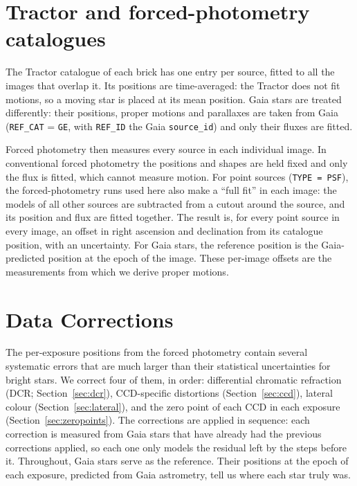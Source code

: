 \documentclass[usenatbib]{mnras}   %
\begin{document}
\section{Tractor and forced-photometry catalogues} \label{sec:forced}

The Tractor catalogue of each brick has one entry per source, fitted to all the images that overlap it. Its positions are time-averaged: the Tractor does not fit motions, so a moving star is placed at its mean position. Gaia stars are treated differently: their positions, proper motions and parallaxes are taken from Gaia (\texttt{REF\_CAT} = \texttt{GE}, with \texttt{REF\_ID} the Gaia \texttt{source\_id}) and only their fluxes are fitted.

Forced photometry then measures every source in each individual image. In conventional forced photometry the positions and shapes are held fixed and only the flux is fitted, which cannot measure motion. For point sources (\texttt{TYPE = PSF}), the forced-photometry runs used here also make a ``full fit'' in each image: the models of all other sources are subtracted from a cutout around the source, and its position and flux are fitted together. The result is, for every point source in every image, an offset in right ascension and declination from its catalogue position, with an uncertainty. For Gaia stars, the reference position is the Gaia-predicted position at the epoch of the image. These per-image offsets are the measurements from which we derive proper motions.

\section{Data Corrections} \label{sec:corrections}

The per-exposure positions from the forced photometry contain several systematic errors that are much larger than their statistical uncertainties for bright stars. We correct four of them, in order: differential chromatic refraction (DCR; Section~\ref{sec:dcr}), CCD-specific distortions (Section~\ref{sec:ccd}), lateral colour (Section~\ref{sec:lateral}), and the zero point of each CCD in each exposure (Section~\ref{sec:zeropoints}). The corrections are applied in sequence: each correction is measured from Gaia stars that have already had the previous corrections applied, so each one only models the residual left by the steps before it. Throughout, Gaia stars serve as the reference. Their positions at the epoch of each exposure, predicted from Gaia astrometry, tell us where each star truly was.
\end{document}

